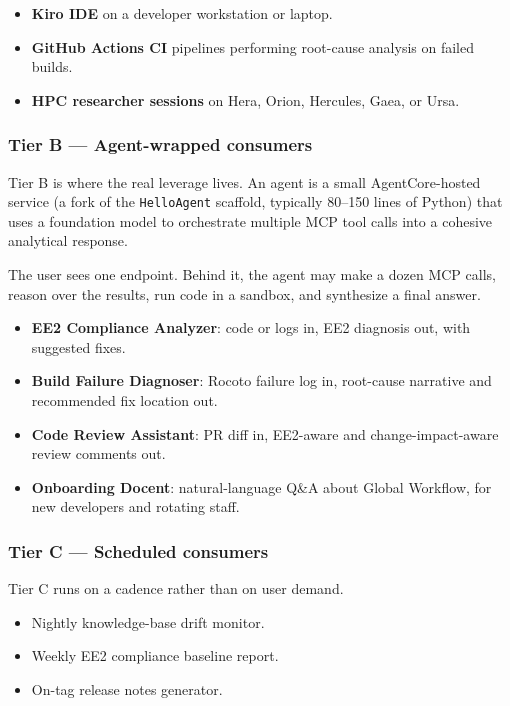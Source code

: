 \documentclass[11pt,letterpaper]{article}
\begin{document}
\begin{itemize}[leftmargin=*, itemsep=2pt]
  \item \textbf{Kiro IDE} on a developer workstation or laptop.
  \item \textbf{GitHub Actions CI} pipelines performing root-cause
        analysis on failed builds.
  \item \textbf{HPC researcher sessions} on Hera, Orion, Hercules,
        Gaea, or Ursa.
\end{itemize}

\subsubsection*{Tier B --- Agent-wrapped consumers}

Tier B is where the real leverage lives. An agent is a small
AgentCore-hosted service (a fork of the \texttt{HelloAgent} scaffold,
typically 80--150 lines of Python) that uses a foundation model to
orchestrate multiple MCP tool calls into a cohesive analytical
response.

The user sees one endpoint. Behind it, the agent may make a dozen
MCP calls, reason over the results, run code in a sandbox, and
synthesize a final answer.

\begin{itemize}[leftmargin=*, itemsep=2pt]
  \item \textbf{EE2 Compliance Analyzer}: code or logs in, EE2
        diagnosis out, with suggested fixes.
  \item \textbf{Build Failure Diagnoser}: Rocoto failure log in,
        root-cause narrative and recommended fix location out.
  \item \textbf{Code Review Assistant}: PR diff in, EE2-aware and
        change-impact-aware review comments out.
  \item \textbf{Onboarding Docent}: natural-language Q\&A about
        Global Workflow, for new developers and rotating staff.
\end{itemize}

\subsubsection*{Tier C --- Scheduled consumers}

Tier C runs on a cadence rather than on user demand.

\begin{itemize}[leftmargin=*, itemsep=2pt]
  \item Nightly knowledge-base drift monitor.
  \item Weekly EE2 compliance baseline report.
  \item On-tag release notes generator.
\end{itemize}
\end{document}

